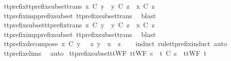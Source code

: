 \begin{isabellebody}
\ tt{\isacharunderscore}prefix{\isacharunderscore}tt{\isacharunderscore}prefix{\isacharunderscore}subset{\isacharunderscore}trans{\isacharcolon}\ {\isachardoublequoteopen}x\ {\isasymle}\isactrlsub C\ y\ {\isasymLongrightarrow}\ y\ {\isasymlesssim}\isactrlsub C\ z\ {\isasymLongrightarrow}\ x\ {\isasymlesssim}\isactrlsub C\ z{\isachardoublequoteclose}\isanewline
%
\isadelimproof
\ \ %
\endisadelimproof
%
\isatagproof
{}\isamarkupfalse%
\ tt{\isacharunderscore}prefix{\isacharunderscore}imp{\isacharunderscore}prefix{\isacharunderscore}subset\ tt{\isacharunderscore}prefix{\isacharunderscore}subset{\isacharunderscore}trans\ \isamarkupfalse%
\ blast%
\endisatagproof
{\isafoldproof}%
%
\isadelimproof
\isanewline
%
\endisadelimproof
\ \isanewline
{}\isamarkupfalse%
\ tt{\isacharunderscore}prefix{\isacharunderscore}subset{\isacharunderscore}tt{\isacharunderscore}prefix{\isacharunderscore}trans{\isacharcolon}\ {\isachardoublequoteopen}x\ {\isasymlesssim}\isactrlsub C\ y\ {\isasymLongrightarrow}\ y\ {\isasymle}\isactrlsub C\ z\ {\isasymLongrightarrow}\ x\ {\isasymlesssim}\isactrlsub C\ z{\isachardoublequoteclose}\isanewline
%
\isadelimproof
\ \ %
\endisadelimproof
%
\isatagproof
{}\isamarkupfalse%
\ tt{\isacharunderscore}prefix{\isacharunderscore}imp{\isacharunderscore}prefix{\isacharunderscore}subset\ tt{\isacharunderscore}prefix{\isacharunderscore}subset{\isacharunderscore}trans\ \isamarkupfalse%
\ blast%
\endisatagproof
{\isafoldproof}%
%
\isadelimproof
\isanewline
%
\endisadelimproof
\isanewline
{}\isamarkupfalse%
\ tt{\isacharunderscore}prefix{\isacharunderscore}decompose{\isacharcolon}\ {\isachardoublequoteopen}x\ {\isasymle}\isactrlsub C\ y\ {\isasymLongrightarrow}\ {\isasymexists}\ z{\isachardot}\ y\ {\isacharequal}\ x\ {\isacharat}\ z{\isachardoublequoteclose}\isanewline
%
\isadelimproof
\ \ %
\endisadelimproof
%
\isatagproof
{}\isamarkupfalse%
\ {\isacharparenleft}induct\ rule{\isacharcolon}tt{\isacharunderscore}prefix{\isachardot}induct{\isacharcomma}\ auto{\isacharparenright}\isanewline
\ \ \isamarkupfalse%
\ tt{\isacharunderscore}prefix{\isachardot}elims{\isacharparenleft}{}{\isacharparenright}\ \isamarkupfalse%
\ auto%
\endisatagproof
{\isafoldproof}%
%
\isadelimproof
\isanewline
%
\endisadelimproof
\isanewline
{}\isamarkupfalse%
\ tt{\isacharunderscore}prefix{\isacharunderscore}subset{\isacharunderscore}ttWF{\isacharcolon}\ {\isachardoublequoteopen}ttWF\ s\ {\isasymLongrightarrow}\ t\ {\isasymlesssim}\isactrlsub C\ s\ {\isasymLongrightarrow}\ ttWF\ t{\isachardoublequoteclose}\isanewline

\end{isabellebody}
